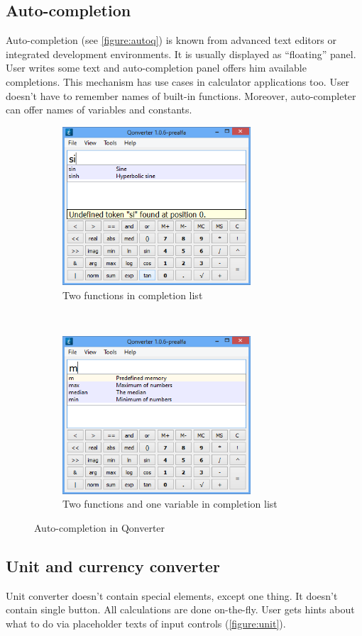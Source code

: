 \subsection{Auto-completion}
Auto-completion (see \autoref{figure:autoq}) is known from advanced text editors or integrated development environments. It is usually displayed as \enquote{floating} panel. User writes some text and auto-completion panel offers him available completions. This mechanism has use cases in calculator applications too. User doesn't have to remember names of built-in functions. Moreover, auto-completer can offer names of variables and constants.

\begin{figure}[ht]
\centering
\begin{subfigure}[t]{0.48\textwidth}
\centering
\includegraphics[width=7cm]{graphics/real-world/08-complete1.png}
\caption{Two functions in completion list}
\end{subfigure}
~
\begin{subfigure}[t]{0.48\textwidth}
\centering
\includegraphics[width=7cm]{graphics/real-world/08-complete2.png}
\caption{Two functions and one variable in completion list}
\end{subfigure}
\caption{Auto-completion in Qonverter}\label{figure:autoq}
\end{figure}

\subsection{Unit and currency converter}
Unit converter doesn't contain special elements, except one thing. It doesn't contain single button. All calculations are done on-the-fly. User gets hints about what to do via placeholder texts of input controls (\autoref{figure:unit}).

